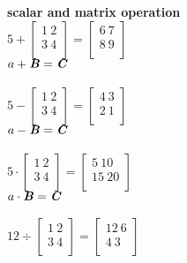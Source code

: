 \documentclass[12pt]{minimal}
\begin{document}
 

\textbf{scalar and matrix operation} \\ 

$
5 +
\begin{bmatrix}
    1\ 2\\
    3\ 4\\
\end{bmatrix} = 
\begin{bmatrix}
    6\ 7\\
    8\ 9\\
\end{bmatrix} 
$ \\ 

$
a + \textbf{\textit{B}} = \textbf{\textit{C}} 
$ \\ \\ 

$
5 -
\begin{bmatrix}
    1\ 2\\
    3\ 4\\
\end{bmatrix} = 
\begin{bmatrix}
    4\ 3\\
    2\ 1\\
\end{bmatrix} 
$ \\ 

$
a - \textbf{\textit{B}} = \textbf{\textit{C}}
$ \\ \\ 


$
5 \cdot
\begin{bmatrix}
    1\ 2\\
    3\ 4\\
\end{bmatrix} = 
\begin{bmatrix}
    5\ 10\\
    15\ 20\\
\end{bmatrix}
$ \\ 

$
a \cdot \textbf{\textit{B}} = \textbf{\textit{C}}
$ \\ \\ 


$
12 \div
\begin{bmatrix}
    1\ 2\\
    3\ 4\\
\end{bmatrix} = 
\begin{bmatrix}
    12\ 6\\
    4\ 3\\
\end{bmatrix}
$ \\ 
\end{document}
